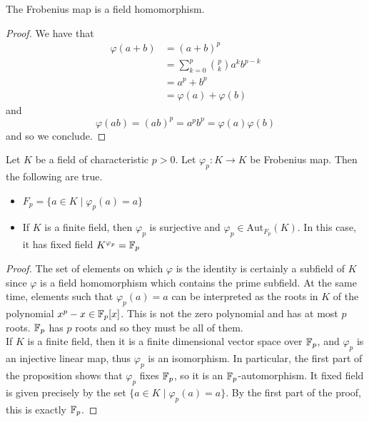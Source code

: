 \documentclass[a4paper]{article}
\begin{document}
\begin{lmm}{}{} The Frobenius map is a field homomorphism. 
\begin{proof}
We have that 
\begin{align*}
\varphi(a+b)&=(a+b)^p\\
&=\sum_{k=0}^p\binom{p}{k}a^kb^{p-k}\\
&=a^p+b^p\\
&=\varphi(a)+\varphi(b)
\end{align*}
and $$\varphi(ab)=(ab)^p=a^pb^p=\varphi(a)\varphi(b)$$ and so we conclude. 
\end{proof}
\end{lmm}

\begin{prp}{}{} Let $K$ be a field of characteristic $p>0$. Let $\varphi_p:K\to K$ be Frobenius map. Then the following are true. 
\begin{itemize}
\item $F_p=\{a\in K\;|\;\varphi_p(a)=a\}$
\item If $K$ is a finite field, then $\varphi_p$ is surjective and $\varphi_p\in\text{Aut}_{F_p}(K)$. In this case, it has fixed field $K^{\varphi_p}=\mathbb{F}_p$
\end{itemize} 
\begin{proof}
The set of elements on which $\varphi$ is the identity is certainly a subfield of $K$ since $\varphi$ is a field homomorphism which contains the prime subfield. At the same time, elements such that $\varphi_p(a)=a$ can be interpreted as the roots in $K$ of the polynomial $x^p-x\in\mathbb{F}_p[x]$. This is not the zero polynomial and has at most $p$ roots. $\mathbb{F}_p$ has $p$ roots and so they must be all of them. \\

If $K$ is a finite field, then it is a finite dimensional vector space over $\mathbb{F}_p$, and $\varphi_p$ is an injective linear map, thus $\varphi_p$ is an isomorphism. In particular, the first part of the proposition shows that $\varphi_p$ fixes $\mathbb{F}_p$, so it is an $\mathbb{F}_p$-automorphism. It fixed field is given precisely by the set $\{a\in K\;|\;\varphi_p(a)=a\}$. By the first part of the proof, this is exactly $\mathbb{F}_p$. 
\end{proof}
\end{prp}
\end{document}
